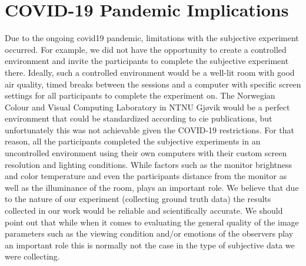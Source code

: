 \section{COVID-19 Pandemic Implications}
Due to the ongoing \acrshort{covid19} pandemic, limitations with the subjective experiment occurred. For example, we did not have the opportunity to create a controlled environment and invite the participants to complete the subjective experiment there. Ideally, such a controlled environment would be a well-lit room with good air quality, timed breaks between the sessions and a computer with specific screen settings for all participants to complete the experiment on. The Norwegian Colour and Visual Computing Laboratory in NTNU Gjøvik would be a perfect environment that could be standardized according to \acrfull{cie} publications, but unfortunately this was not achievable given the COVID-19 restrictions. For that reason, all the participants completed the subjective experiments in an uncontrolled environment using their own computers with their custom screen resolution and lighting conditions. While factors such as the monitor brightness and color temperature and even the participants distance from the monitor as well as the illuminance of the room, plays an important role. We believe that due to the nature of our experiment (collecting ground truth data) the results collected in our work would be reliable and scientifically accurate. We should point out that while when it comes to evaluating the general quality of the image parameters such as the viewing condition and/or emotions of the observers play an important role this is normally not the case in the type of subjective data we were collecting. 

\raggedbottom %

